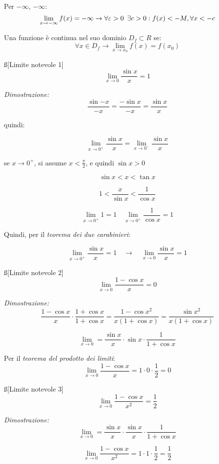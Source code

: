 \documentclass[12pt]{article}
\begin{document}
Per $-\infty$, $-\infty$:
$$ \lim_{x \to -\infty} f(x) = -\infty \rightarrow \forall \varepsilon > 0 \hspace{0.5em} \exists c > 0: f(x) < -M, \forall x < -c $$

\s[Continuità]
Una funzione è continua nel suo dominio $D_f \subset R$ se:
$$ \forall x \in D_f \rightarrow \lim_{x \to x_0} f(x) = f(x_0) $$

\ss[Limite notevole 1]
$$ \lim_{x \to 0} \frac{\sin{x}}{x} = 1 $$

\textit{Dimostrazione:}
$$ \frac{\sin{-x}}{-x} = \frac{-\sin{x}}{-x} = \frac{\sin{x}}{x} $$

quindi:

$$ \lim_{x \to 0^{+}} \frac{\sin{x}}{x} = \lim_{x \to 0^{-}} \frac{\sin{x}}{x} $$

se $x\to 0^{+}$, si assume $x < \frac{\pi}{2}$, e quindi $\sin{x} > 0$

$$ \sin{x} < x < \tan{x} $$

$$ 1 < \frac{x}{\sin{x}} < \frac{1}{\cos{x}} $$

$$ \lim_{x \to 0^{+}} 1 = 1 \hspace{1em} \lim_{x \to 0^{+}} \frac{1}{\cos{x}} = 1 $$

Quindi, per il \textit{teorema dei due carabinieri}:

$$ \lim_{x \to 0^{+}} \frac{\sin{x}}{x} = 1 \hspace{1em} \rightarrow \hspace{1em} \lim_{x \to 0} \frac{\sin{x}}{x} = 1 $$

\ss[Limite notevole 2]
$$ \lim_{x \to 0} \frac{1 - \cos{x}}{x} = 0 $$

\textit{Dimostrazione:}
$$ \frac{1 - \cos{x}}{x} \cdot \frac{1 + \cos{x}}{1 + \cos{x}} = \frac{1 - \cos{x}^2}{x(1 + \cos{x})} = \frac{\sin{x}^2}{x(1 + \cos{x})} $$

$$ \lim_{x \to 0} = \frac{\sin{x}}{x} \cdot \sin{x} \cdot \frac{1}{1+\cos{x}} $$

Per il \textit{teorema del prodotto dei limiti}:
$$ \lim_{x \to 0} \frac{1 - \cos{x}}{x} = 1 \cdot 0 \cdot \frac{1}{2} = 0 $$

\ss[Limite notevole 3]
$$ \lim_{x \to 0} \frac{1 - \cos{x}}{x^2} = \frac{1}{2} $$

\textit{Dimostrazione:}
$$ \lim_{x \to 0} = \frac{\sin{x}}{x} \cdot \frac{\sin{x}}{x} \cdot \frac{1}{1+\cos{x}} $$

$$ \lim_{x \to 0} \frac{1 - \cos{x}}{x^2} = 1 \cdot 1 \cdot \frac{1}{2} = \frac{1}{2} $$
\end{document}
